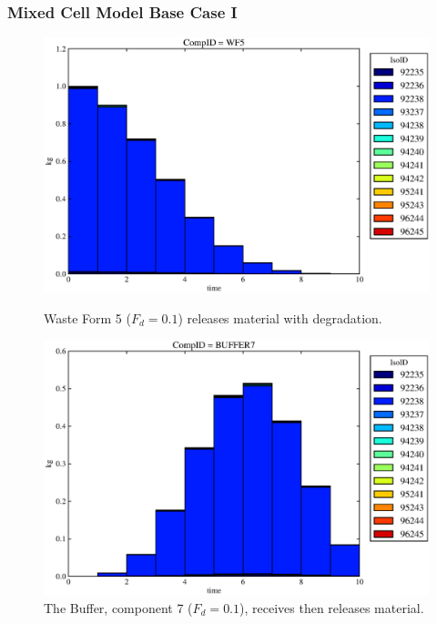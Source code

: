 \begin{frame}[ctb!]
  \frametitle{Mixed Cell Model Base Case I}
  \begin{figure}[htbp!]
\begin{minipage}[b]{0.45\linewidth}

  \includegraphics[width=\textwidth]{./images/mcI1.eps}
  \caption[MCI Waste Form Contaminants.]{
    Waste Form 5 ($F_d = 0.1$) releases material with degradation. 
    }
  \label{fig:mcIwf5}
  
  \includegraphics[width=\textwidth]{./images/mcI3.eps}
  \caption[Case MCI Buffer Contaminants]{
    The Buffer, component 7 ($F_d=0.1$), receives then releases material.
    }
  \label{fig:mcIbuff}


\end{minipage}
\end{figure}
\end{frame}
